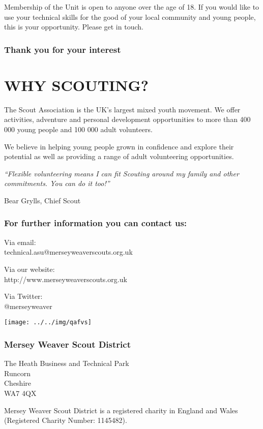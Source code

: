 \documentclass[12pt,foldmark]{leaflet}
\begin{document}
Membership of the Unit is open to anyone over the age of 18. If you would like to use your technical skills for the good of your local community and young people, this is your opportunity. Please get in touch.
\vfill
\subsubsection{Thank you for your interest}
\newpage

\withrotationtrue
\section{WHY SCOUTING?}
\withrotationfalse
The Scout Association is the UK's largest mixed youth movement. We offer activities, adventure and personal development opportunities to more than 400 000 young people and 100 000 adult volunteers.

We believe in helping young people grown in confidence and explore their potential as well as providing a range of adult volunteering opportunities.
\vfill
\epigraph{\textit{``Flexible volunteering means I can fit Scouting around my family and other commitments. You can do it too!''}}{Bear Grylls, Chief Scout}

\newpage

\null
\vfill
\subsubsection{For further information you can contact us:}
Via email:\\
technical.asu@merseyweaverscouts.org.uk

Via our website:\\
http://www.merseyweaverscouts.org.uk

Via Twitter:\\
@merseyweaver
\newpage

\hfill\texttt{[image: ../../img/qafvs]}\\

\subsubsection{Mersey Weaver Scout District}
The Heath Business and Technical Park\\
Runcorn\\
Cheshire\\
WA7 4QX\\

\vspace{2cm}

{\small Mersey Weaver Scout District is a registered charity in England and Wales (Registered Charity Number: 1145482).}
\end{document}
